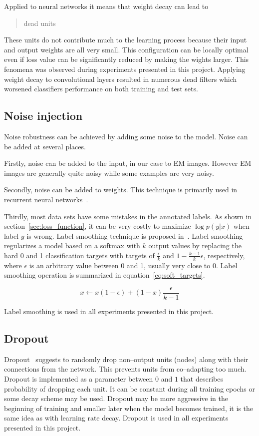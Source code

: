 \documentclass[a4paper, 11pt, table]{article}
\begin{document}
Applied to neural networks it means that weight decay can lead to \blockquote{dead units}. These units do not contribute much to the learning process because their input and output weights are all very small. This configuration can be locally optimal even if loss value can be significantly reduced by making the wights larger. This fenomena was observed during experiments presented in this project. Applying weight decay to convolutional layers resulted in numerous dead filters which worsened classifiers performance on both training and test sets.

\subsection{Noise injection}
Noise robustness can be achieved by adding some noise to the model. Noise can be added at several places. 

Firstly, noise can be added to the input, in our case to EM images. However EM images are generally quite noisy while some examples are very noisy. 

Secondly, noise can be added to weights. This technique is primarily used in recurrent neural networks~\cite{jim1996}. 

Thirdly, most data sets have some mistakes in the annotated labels. As shown in section~\ref{sec:loss_function}, it can be very costly to maximize $\log p(y|x)$ when label $y$ is wrong. Label smoothing technique is proposed in~\cite{dl_book}. Label smoothing regularizes a model based on a softmax with $k$ output values by replacing the hard 0 and 1 classification targets with targets of $\frac{\epsilon}{k}$ and $1 - \frac{k-1}{k}\epsilon$, respectively, where $\epsilon$ is an arbitrary value between 0 and 1, usually very close to 0. Label smoothing operation is summarized in equation~\ref{eq:soft_targets}.

\begin{equation}
\label{eq:soft_targets}
x \leftarrow x \left( 1 - \epsilon \right) + \left(1 - x\right) \frac{\epsilon}{k - 1}
\end{equation}

Label smoothing is used in all experiments presented in this project.

\subsection{Dropout}
Dropout~\cite{JMLR:v15:srivastava14a} suggests to randomly drop non--output units (nodes) along with their connections from the network. This prevents units from co--adapting too much. Dropout is implemented as a parameter between $0$ and $1$ that describes probability of dropping each unit. It can be constant during all training epochs or some decay scheme may be used. Dropout may be more aggressive in the beginning of training and smaller later when the model becomes trained, it is the same idea as with learning rate decay. Dropout is used in all experiments presented in this project.
\end{document}

